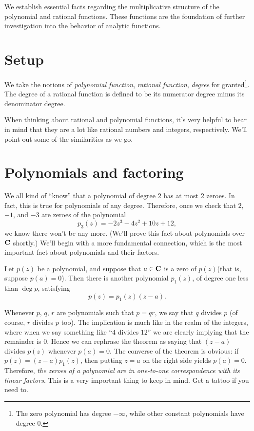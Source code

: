 \documentclass[twocolumn,12pt]{article}
\date{March 15, 2013 (Fri)}
\begin{document}
\makeheader

\begin{summary}

  We establish essential facts regarding the multiplicative structure of the polynomial and rational functions. These functions are the foundation of further investigation into the behavior of analytic functions.

\end{summary}

\section{Setup}
We take the notions of \emph{polynomial function}, \emph{rational function}, \emph{degree} for granted\footnote{The zero polynomial has degree $-\infty$, while other constant polynomials have degree $0$.}. The degree of a rational function is defined to be its numerator degree minus its denominator degree. 

When thinking about rational and polynomial functions, it's very helpful to bear in mind that they are a lot like rational numbers and integers, respectively. We'll point out some of the similarities as we go.

\section{Polynomials and factoring}
We all kind of ``know'' that a polynomial of degree $2$ has at most 2 zeroes. In fact, this is true for polynomials of any degree. Therefore, once we check that $2$, $-1$, and $-3$ are zeroes of the polynomial
\[
  p_3(z) = -2z^3 - 4z^2 + 10z + 12, 
\]
we know there won't be any more. (We'll prove this fact about polynomials over $\mathbf{C}$ shortly.) We'll begin with a more fundamental connection, which is the most important fact about polynomials and their factors.
\begin{Theorem} \label{thm:zeroesfactors}
  Let $p(z)$ be a polynomial, and suppose that $a \in \mathbf{C}$ is a zero of $p(z)$(that is, suppose $p(a) = 0$). Then there is another polynomial $p_1(z)$, of degree one less than $\deg{p}$, satisfying
  \[
    p(z) = p_1(z)(z-a).
  \]
\end{Theorem}
Whenever $p$, $q$, $r$ are polynomials such that $p = qr$, we say that $q$ divides $p$ (of course, $r$ divides $p$ too). The implication is much like in the realm of the integers, where when we say something like ``$4$ divides $12$'' we are clearly implying that the remainder is 0. Hence we can rephrase the theorem as saying that $(z-a)$ divides $p(z)$ whenever $p(a) = 0$. The converse of the theorem is obvious: if $p(z) = (z - a)p_1(z)$, then putting $z = a$ on the right side yields $p(a) = 0$. Therefore, \emph{the zeroes of a polynomial are in one-to-one correspondence with its linear factors}. This is a very important thing to keep in mind. Get a tattoo if you need to.
\end{document}
